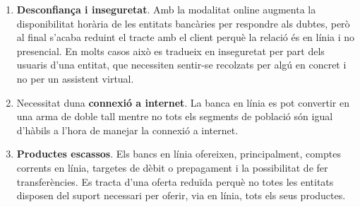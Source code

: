 \begin{enumerate}
    \item \textbf{Desconfiança i inseguretat}. Amb la modalitat online augmenta la disponibilitat horària de les entitats bancàries per respondre als dubtes, però al final s'acaba reduint el tracte amb el client perquè la relació és en línia i no presencial. En molts casos això es tradueix en inseguretat per part dels usuaris d'una entitat, que necessiten sentir-se recolzats per algú en concret i no per un assistent virtual.
    \item Necessitat duna \textbf{connexió a internet}. La banca en línia es pot convertir en una arma de doble tall mentre no tots els segments de població són igual d'hàbils a l'hora de manejar la connexió a internet.
    \item \textbf{Productes escassos}. Els bancs en línia ofereixen, principalment, comptes corrents en línia, targetes de dèbit o prepagament i la possibilitat de fer transferències. Es tracta d'una oferta reduïda perquè no totes les entitats disposen del suport necessari per oferir, via en línia, tots els seus productes.
\end{enumerate}

